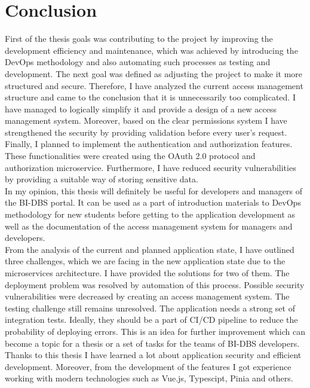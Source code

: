 \chapter{Conclusion} First of the thesis goals was contributing to the project by improving the development efficiency and maintenance, which was achieved by introducing the DevOps methodology and also automating such processes as testing and development. The next goal was defined as adjusting the project to make it more structured and secure. Therefore, I have analyzed the current access management structure and came to the conclusion that it is unnecessarily too complicated. I have managed to logically simplify it and provide a design of a new access management system. Moreover, based on the clear permissions system I have strengthened the security by providing validation before every user's request. Finally, I planned to implement the authentication and authorization features. These functionalities were created using the OAuth 2.0 protocol and authorization microservice. Furthermore, I have reduced security vulnerabilities by providing a suitable way of storing sensitive data.\\
In my opinion, this thesis will definitely be useful for developers and managers of the BI-DBS portal. It can be used as a part of introduction materials to DevOps methodology for new students before getting to the application development as well as the documentation of the access management system for managers and developers.\\
From the analysis of the current and planned application state, I have outlined three challenges, which we are facing in the new application state due to the microservices architecture. I have provided the solutions for two of them. The deployment problem was resolved by automation of this process. Possible security vulnerabilities were decreased by creating an access management system. The testing challenge still remains unresolved. The application needs a strong set of integration tests. Ideally, they should be a part of CI/CD pipeline to reduce the probability of deploying errors. This is an idea for further improvement which can become a topic for a thesis or a set of tasks for the teams of BI-DBS developers.\\
Thanks to this thesis I have learned a lot about application security and efficient development. Moreover, from the development of the features I got experience working with modern technologies such as Vue.js, Typescipt, Pinia and others.
